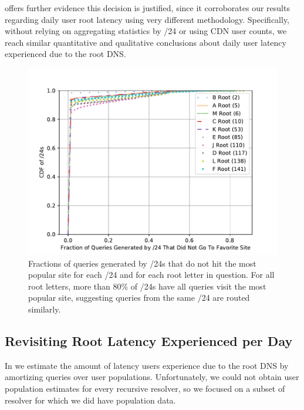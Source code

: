 \documentclass[sigconf,letterpaper,nonacm,10pt,anonymous]{acmart}
\begin{document}
 offers further evidence this
decision is justified, since it corroborates our results regarding daily
user root latency using very different methodology. Specifically,
without relying on aggregating statistics by /24 or using CDN user
counts, we reach similar quantitative and qualitative conclusions about
daily user latency experienced due to the root DNS.

\begin{figure}
    \centering
    \includegraphics[width=\linewidth]{figures/routing_similarity_by_24.pdf}
    \caption{Fractions of queries generated by /24s that do not hit the most popular site for each /24 and for each root letter in question. For all root letters, more than 80\% of /24s have all queries visit the most popular site, suggesting queries from the same /24 are routed similarly.}
    \label{fig:routing_similarity_by_24}
\end{figure}

\subsection{Revisiting Root Latency Experienced per
Day}\label{revisiting-root-latency-experienced-per-day-1}

\label{ap:apnic_root_latency_per_day}

In  we estimate the amount of latency users
experience due to the root DNS by amortizing queries over user
populations. Unfortunately, we could not obtain user population
estimates for every recursive resolver, so we focused on a subset of
resolver for which we did have population data.
\end{document}
